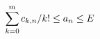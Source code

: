 \documentclass[preview]{standalone}
\begin{document}
\begin{align*}
\special{dvisvgm:raw <g id='unique000'>}\sum_{k=0}^{m}c_{k,n}/k!\le a_n\le E\special{dvisvgm:raw </g>}
\end{align*}
\end{document}
